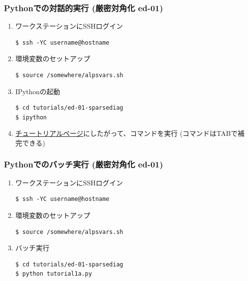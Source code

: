 \begin{frame}[t,fragile]
  \frametitle{Pythonでの対話的実行 (厳密対角化 ed-01)}
  \begin{enumerate}
  \item ワークステーションにSSHログイン
\begin{lstlisting}
$ ssh -YC username@hostname
\end{lstlisting}
  \item 環境変数のセットアップ
\begin{lstlisting}
$ source /somewhere/alpsvars.sh
\end{lstlisting}
  \item IPythonの起動
\begin{lstlisting}
$ cd tutorials/ed-01-sparsediag
$ ipython
\end{lstlisting}
  \item \href{http://alps.comp-phys.org/mediawiki/index.php/ALPS_2_Tutorials:ED-01_SparseDiagonalization/ja#Python.E3.81.A7.E3.81.AE.E5.AE.9F.E8.A1.8C}{チュートリアルページ}にしたがって、コマンドを実行 (コマンドはTABで補完できる)
  \end{enumerate}
\end{frame}

\begin{frame}[t,fragile]
  \frametitle{Pythonでのバッチ実行 (厳密対角化 ed-01)}
  \begin{enumerate}
  \item ワークステーションにSSHログイン
\begin{lstlisting}
$ ssh -YC username@hostname
\end{lstlisting}
  \item 環境変数のセットアップ
\begin{lstlisting}
$ source /somewhere/alpsvars.sh
\end{lstlisting}
  \item バッチ実行
\begin{lstlisting}
$ cd tutorials/ed-01-sparsediag
$ python tutorial1a.py
\end{lstlisting}
  \end{enumerate}
\end{frame}

